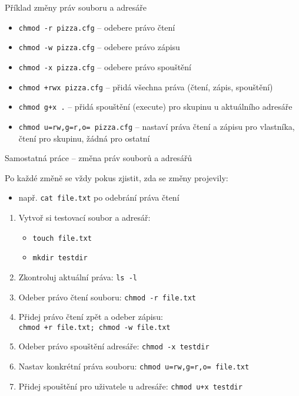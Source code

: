\documentclass{beamer}
\begin{document}
\begin{frame}[fragile]{Příklad změny práv souboru a adresáře}
	\begin{itemize}
		\item \texttt{chmod -r pizza.cfg} – odebere právo čtení
		\item \texttt{chmod -w pizza.cfg} – odebere právo zápisu
		\item \texttt{chmod -x pizza.cfg} – odebere právo spouštění
		\item \texttt{chmod +rwx pizza.cfg} – přidá všechna práva (čtení, zápis, spouštění)
		\item \texttt{chmod g+x .} – přidá spouštění (execute) pro skupinu u aktuálního adresáře
		\item \texttt{chmod u=rw,g=r,o= pizza.cfg} – nastaví práva čtení a zápisu pro vlastníka, čtení pro skupinu, žádná pro ostatní
		
	\end{itemize}
	
\end{frame}


\begin{frame}{Samostatná práce – změna práv souborů a adresářů}
	\small
	
	Po každé změně se vždy pokus zjistit, zda se změny projevily:
	\begin{itemize}
		\item např. \texttt{cat file.txt} po odebrání práva čtení

	\end{itemize}
	
	\begin{enumerate}
		\item Vytvoř si testovací soubor a adresář:
		\begin{itemize}
			\item \texttt{touch file.txt}
			\item \texttt{mkdir testdir}
		\end{itemize}
		\item Zkontroluj aktuální práva: \texttt{ls -l}
		\item Odeber právo čtení souboru: \texttt{chmod -r file.txt}
		\item Přidej právo čtení zpět a odeber zápisu: \\ \texttt{chmod +r file.txt; chmod -w file.txt}
		\item Odeber právo spouštění adresáře: \texttt{chmod -x testdir}
		\item Nastav konkrétní práva souboru: \texttt{chmod u=rw,g=r,o= file.txt}
		\item Přidej spouštění pro uživatele u adresáře: \texttt{chmod u+x testdir}
	\end{enumerate}

\end{frame}
\end{document}
